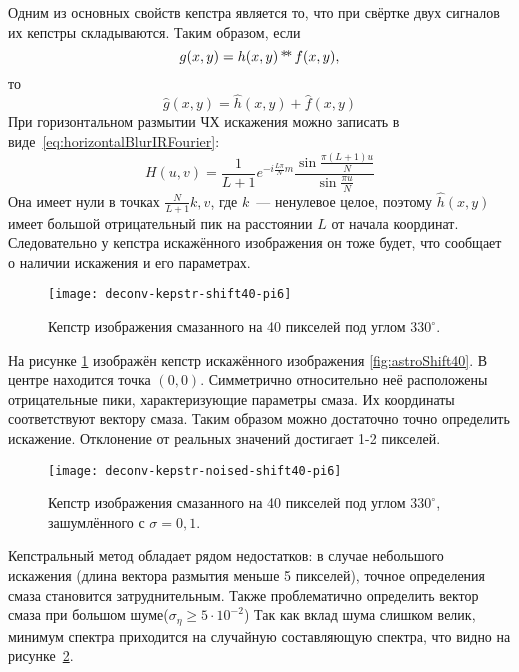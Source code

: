 Одним из основных свойств кепстра является то, что при свёртке двух сигналов их кепстры складываются. Таким образом, если
\begin{equation}
	g(x,y) = h(x,y) \operatorname*{*\!*} f(x,y),
\end{equation}
то \cite{iterableImageRestorationBiemonLangdeik}
\begin{equation}\label{eq:kepstrSum}
	\hat{g}(x,y) = \hat{h}(x,y) + \hat{f}(x,y)
\end{equation}
При горизонтальном размытии ЧХ искажения можно записать в виде~\ref{eq:horizontalBlurIRFourier}:
\begin{equation*}
H(u,v) =       
\frac{1}{L+1}e^{-i\frac{L\pi}{N}m}\frac{\sin\frac{\pi(L+1)u}{N}}{\sin\frac{\pi u}{N}}
\end{equation*}
Она имеет нули в точках $\frac{N}{L+1}k, v$, где $k$~--- ненулевое целое, поэтому $\hat{h}(x,y)$ имеет большой отрицательный пик на расстоянии $L$ от начала координат. Следовательно у кепстра искажённого изображения он тоже будет, что сообщает о наличии искажения и его параметрах.
\begin{figure}[h!]
	\centerline{\texttt{[image: deconv-kepstr-shift40-pi6]}}
	\caption{Кепстр изображения смазанного на 40 пикселей под углом $330^{\circ}$.}
	\label{fig:kepstr}
\end{figure}

На рисунке \ref{fig:kepstr} изображён кепстр искажённого изображения \ref{fig:astroShift40}. В центре находится точка $(0,0)$. Симметрично относительно неё расположены отрицательные пики, характеризующие параметры смаза. Их координаты соответствуют вектору смаза.
Таким образом можно достаточно точно определить искажение. Отклонение от реальных значений достигает 1-2 пикселей.

\begin{figure}[h!]
	\centerline{\texttt{[image: deconv-kepstr-noised-shift40-pi6]}}
	\caption{Кепстр изображения смазанного на 40 пикселей под углом $330^{\circ}$, зашумлённого с $\sigma=0,1$.}
	\label{fig:kepstrNoised}
\end{figure}
Кепстральный метод обладает рядом недостатков: в случае небольшого искажения (длина вектора размытия меньше 5 пикселей), точное определения смаза становится затруднительным. Также проблематично определить вектор смаза при большом шуме($\sigma_\eta \geq 5\cdot 10^{-2}$) Так как вклад шума слишком велик, минимум спектра приходится на случайную составляющую спектра, что видно на рисунке~\ref{fig:kepstrNoised}.

